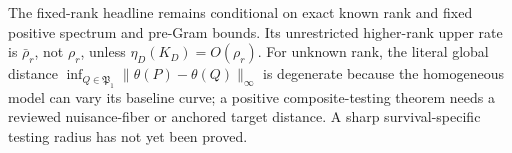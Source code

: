 The fixed-rank headline remains conditional on exact known rank and fixed positive spectrum and pre-Gram bounds.  Its unrestricted higher-rank upper rate is \(\bar\rho_r\), not \(\rho_r\), unless \(\eta_D(K_D)=O(\rho_r)\).  For unknown rank, the literal global distance \(\inf_{Q\in\mathfrak P_1}\|\theta(P)-\theta(Q)\|_\infty\) is degenerate because the homogeneous model can vary its baseline curve; a positive composite-testing theorem needs a reviewed nuisance-fiber or anchored target distance.  A sharp survival-specific testing radius has not yet been proved.